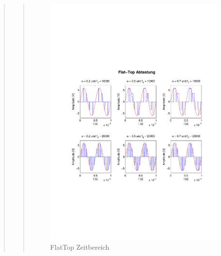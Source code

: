 \begin{quote}
\begin{quote}
        
        \begin{figure}[H]
            \centering
            \hspace{-3em}
            \includegraphics[scale=0.8, trim = 2cm 7cm 1cm 8cm, clip]{Bilder/FlatTop_Sign}
            \caption{FlatTop Zeitbereich}
            \label{fig:FlatTop_Sign}
        \end{figure}
        

\end{quote}
\end{quote}
